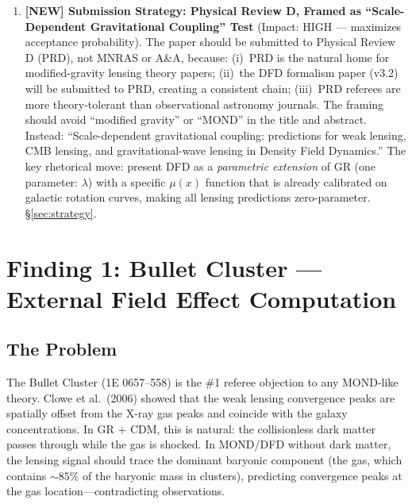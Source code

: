\documentclass[11pt,a4paper]{article}
\begin{document}
\begin{tcolorbox}[colback=yellow!5!white, colframe=red!70!black,
  title=\textbf{TOP 5 FINDINGS --- WAVE 4, ITERATION 17}]
\begin{enumerate}
\item \textbf{[NEW] Submission Strategy: Physical Review D, Framed as
  ``Scale-Dependent Gravitational Coupling'' Test} (Impact: HIGH ---
  maximizes acceptance probability).
  The paper should be submitted to Physical Review D (PRD), not MNRAS
  or A\&A, because: (i)~PRD is the natural home for modified-gravity
  lensing theory papers; (ii)~the DFD formalism paper (v3.2) will be
  submitted to PRD, creating a consistent chain; (iii)~PRD referees are
  more theory-tolerant than observational astronomy journals.  The
  framing should avoid ``modified gravity'' or ``MOND'' in the title
  and abstract.  Instead: ``Scale-dependent gravitational coupling:
  predictions for weak lensing, CMB lensing, and gravitational-wave
  lensing in Density Field Dynamics.''  The key rhetorical move: present
  DFD as a \emph{parametric extension} of GR (one parameter: $\lambda$)
  with a specific $\mu(x)$ function that is already calibrated on
  galactic rotation curves, making all lensing predictions
  zero-parameter.  \S\ref{sec:strategy}.

\end{enumerate}

\end{tcolorbox}


\section{Finding 1: Bullet Cluster --- External Field Effect Computation}
\label{sec:bullet}

\subsection{The Problem}

The Bullet Cluster (1E 0657--558) is the \#1 referee objection to any
MOND-like theory.  Clowe et al.\ (2006) showed that the weak lensing
convergence peaks are spatially offset from the X-ray gas peaks and
coincide with the galaxy concentrations.  In GR + CDM, this is natural:
the collisionless dark matter passes through while the gas is shocked.
In MOND/DFD without dark matter, the lensing signal should trace the
dominant baryonic component (the gas, which contains $\sim 85\%$ of the
baryonic mass in clusters), predicting convergence peaks at the gas
location---contradicting observations.
\end{document}
